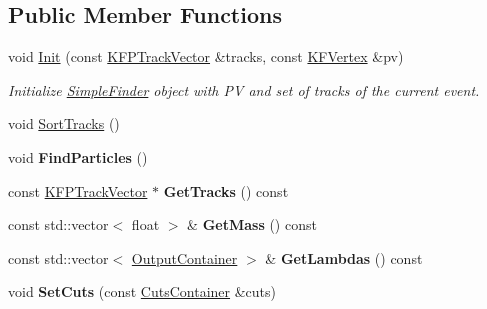 \subsection*{Public Member Functions}
\begin{DoxyCompactItemize}
\item 
void \hyperlink{classSimpleFinder_ab882be29eaf3e80f7f754b3a8682dc31}{Init} (const \hyperlink{classKFPTrackVector}{K\+F\+P\+Track\+Vector} \&tracks, const \hyperlink{classKFVertex}{K\+F\+Vertex} \&pv)\hypertarget{classSimpleFinder_ab882be29eaf3e80f7f754b3a8682dc31}{}\label{classSimpleFinder_ab882be29eaf3e80f7f754b3a8682dc31}

\begin{DoxyCompactList}\small\item\em Initialize \hyperlink{classSimpleFinder}{Simple\+Finder} object with PV and set of tracks of the current event. \end{DoxyCompactList}\item 
void \hyperlink{classSimpleFinder_aae81d5b2382f10072b91307af30ba4a2}{Sort\+Tracks} ()
\item 
void {\bfseries Find\+Particles} ()\hypertarget{classSimpleFinder_a319d1c4da78badd59a538b9839bb2632}{}\label{classSimpleFinder_a319d1c4da78badd59a538b9839bb2632}

\item 
const \hyperlink{classKFPTrackVector}{K\+F\+P\+Track\+Vector} $\ast$ {\bfseries Get\+Tracks} () const \hypertarget{classSimpleFinder_aa1974407925dcb83efad1c68f40fe888}{}\label{classSimpleFinder_aa1974407925dcb83efad1c68f40fe888}

\item 
const std\+::vector$<$ float $>$ \& {\bfseries Get\+Mass} () const \hypertarget{classSimpleFinder_a381a4edacf6f8196a7298846f2f6f0ce}{}\label{classSimpleFinder_a381a4edacf6f8196a7298846f2f6f0ce}

\item 
const std\+::vector$<$ \hyperlink{classOutputContainer}{Output\+Container} $>$ \& {\bfseries Get\+Lambdas} () const \hypertarget{classSimpleFinder_afad8fd09c999b7aea6097fb0797c860b}{}\label{classSimpleFinder_afad8fd09c999b7aea6097fb0797c860b}

\item 
void {\bfseries Set\+Cuts} (const \hyperlink{classCutsContainer}{Cuts\+Container} \&cuts)\hypertarget{classSimpleFinder_a48534300d76d38ae2aa9f1f70dc92d4e}{}\label{classSimpleFinder_a48534300d76d38ae2aa9f1f70dc92d4e}

\end{DoxyCompactItemize}
